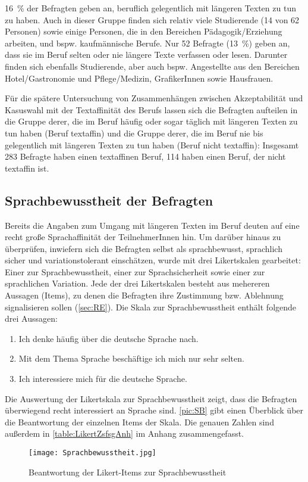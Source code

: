 16~\% der Befragten geben an, beruflich gelegentlich mit längeren Texten zu tun zu haben. 
Auch in dieser Gruppe finden sich relativ viele Studierende (14 von 62 Personen) sowie einige Personen, die in den Bereichen Pädagogik/Erziehung arbeiten, und bspw. kaufmännische Berufe.
Nur 52 Befragte (13~\%) geben an, dass sie im Beruf selten oder nie längere Texte verfassen oder lesen. 
Darunter finden sich ebenfalls Studierende, aber auch bspw. Angestellte aus den Bereichen Hotel/Gastronomie und Pflege/Medizin, GrafikerInnen sowie Hausfrauen. 

Für die spätere Untersuchung von Zusammenhängen zwischen Akzeptabilität und Kasuswahl mit der Textaffinität des Berufs lassen sich die Befragten aufteilen in die Gruppe derer, die im Beruf häufig oder sogar täglich mit längeren Texten zu tun haben (Beruf textaffin) und die Gruppe derer, die im Beruf nie bis gelegentlich mit längeren Texten zu tun haben (Beruf nicht textaffin): 
Insgesamt 283 Befragte haben einen textaffinen Beruf, 114 haben einen Beruf, der nicht textaffin ist. 
\subsection{Sprachbewusstheit der Befragten}
\label{sec:Sprachbewusstheit}
Bereits die Angaben zum Umgang mit längeren Texten im Beruf deuten auf eine recht große Sprachaffinität der TeilnehmerInnen hin. 
Um darüber hinaus zu überprüfen, inwiefern sich die Befragten selbst als sprachbewusst, sprachlich sicher und variationstolerant einschätzen, wurde mit drei Likertskalen gearbeitet:
Einer zur Sprachbewusstheit, einer zur Sprachsicherheit sowie einer zur sprachlichen Variation. 
Jede der drei Likertskalen besteht aus mehereren Aussagen (Items), zu denen die Befragten ihre Zustimmung bzw. Ablehnung signalisieren sollen (\autoref{sec:RE}). 
Die Skala zur Sprachbewusstheit enthält folgende drei Aussagen: 
\begin{enumerate}
\item Ich denke häufig über die deutsche Sprache nach.
\item Mit dem Thema Sprache beschäftige ich mich nur sehr selten.
\item Ich interessiere mich für die deutsche Sprache. 
\end{enumerate}

\noindent Die Auswertung der Likertskala zur Sprachbewusstheit zeigt, dass die Befragten überwiegend recht interessiert an Sprache sind. 
\autoref{pic:SB} gibt einen Überblick über die Beantwortung der einzelnen Items der Skala. 
Die genauen Zahlen sind außerdem in \autoref{table:LikertZsfsgAnh} im Anhang zusammengefasst. 
\begin{figure}
\centering
\texttt{[image: Sprachbewusstheit.jpg]}
\caption{Beantwortung der Likert-Items zur Sprachbewusstheit}
\label{pic:SB}
\end{figure}
 
